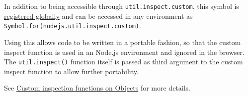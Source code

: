 In addition to being accessible through \texttt{util.inspect.custom},
this symbol is
\href{https://developer.mozilla.org/en-US/docs/Web/JavaScript/Reference/Global_Objects/Symbol/for}{registered
globally} and can be accessed in any environment as
\texttt{Symbol.for(\textquotesingle{}nodejs.util.inspect.custom\textquotesingle{})}.

Using this allows code to be written in a portable fashion, so that the
custom inspect function is used in an Node.js environment and ignored in
the browser. The \texttt{util.inspect()} function itself is passed as
third argument to the custom inspect function to allow further
portability.

\begin{Shaded}
\begin{Highlighting}[]
\OperatorTok{=} \NormalTok{(}\NormalTok{)}\OperatorTok{;}

     \OperatorTok{=}\OperatorTok{;}
\NormalTok{  \}}

  \NormalTok{() \{}
     \OperatorTok{;}
\NormalTok{  \}}

\OperatorTok{,}\OperatorTok{,}
     \SpecialCharTok{$\{}\NormalTok{()}\SpecialCharTok{\}}\VerbatimStringTok{\textgreater{}\textasciigrave{}}\OperatorTok{;}
\NormalTok{  \}}
\NormalTok{\}}

\OperatorTok{=}  \NormalTok{(}\NormalTok{)}\OperatorTok{;}
\OperatorTok{;}
\end{Highlighting}
\end{Shaded}

See \hyperref[custom-inspection-functions-on-objects]{Custom inspection
functions on Objects} for more details.

